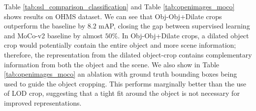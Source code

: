 Table \ref{tab:ssl_comparison_classification} and Table \ref{tab:openimages_moco} shows results on OHMS dataset.  We can see that Obj-Obj+Dilate crops outperform the baseline by $8.2$ mAP, closing the gap between supervised learning and MoCo-v2 baseline by almost $50\%$. 
In Obj-Obj+Dilate crops, a dilated object crop would potentially contain the entire object and more scene information; therefore, the representation from the dilated object-crop contains complementary information from both the object and the scene.  
We also show in Table \ref{tab:openimages_moco} an ablation with ground truth bounding boxes being used to guide the object cropping. This performs marginally better than the use of LOD crop, suggesting that a tight fit around the object is not necessary for improved representations. 





